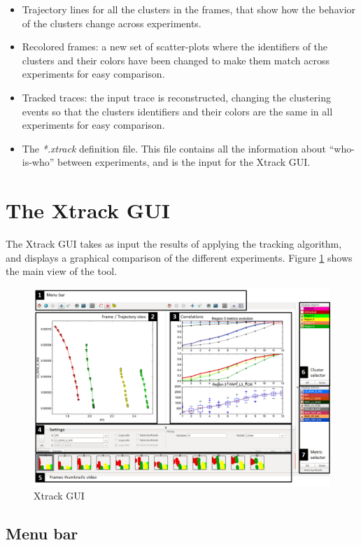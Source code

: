 \documentclass[twoside,a4,english,11pt]{book}
\begin{document}
\begin{itemize}
 \item Trajectory lines for all the clusters in the frames, that show how the behavior of the clusters change across experiments.
 \item Recolored frames: a new set of scatter-plots where the identifiers of the clusters and their colors have been changed to make them match across experiments for easy comparison.
 \item Tracked traces: the input trace is reconstructed, changing the clustering events so that the clusters identifiers and their colors are the same in all experiments for easy comparison.
 \item The \emph{*.xtrack} definition file. This file contains all the information about ``who-is-who'' between experiments, and is the input for the Xtrack GUI. 
\end{itemize}

        
\section{The Xtrack GUI}

The Xtrack GUI takes as input the results of applying the tracking algorithm, and displays a graphical comparison of the different experiments. Figure 
\ref{fig:GUI} shows the main view of the tool.

\begin{figure}[t]
\centering
\includegraphics[width=1\textwidth]{imgs/xtrack_gui.png}
\caption{Xtrack GUI}
\label{fig:GUI}
\end{figure}

\subsection{Menu bar}
\end{document}
